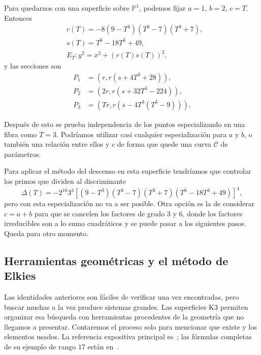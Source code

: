 \documentclass[a4paper]{book}
\theoremstyle{definition}
\theoremstyle{plain}
\newcommand{\PP}{\mathbb{P}}
\newcommand{\cc}{\mathcal{C}}
\newcommand{\lco}{\left\lbrack}
\newcommand{\rco}{\right\rbrack}
\begin{document}
Para quedarnos con una superficie sobre $\PP^1$, podemos fijar $a=1$, $b=2$, $c=T$. Entonces
\[
\begin{aligned}
&r(T) =-8(9-T^3)(T^3-7)(T^3+7),\\
&s(T) =T^6-18T^3+49,\\
&E_T  :y^2=x^3+{(r(T)s(T))}^2,
\end{aligned}
\]
y las secciones son
\[
\begin{aligned}
P_1&=(r,r(s+4T^3+28)),\\
P_2&=(2r,r(s+32T^3-224)),\\
P_3&=(Tr,r(s-4T^3(T^3-9))).
\end{aligned}
\]

Después de esto se prueba independencia de los puntos especializando en una fibra como $T=3$. Podríamos utilizar casi cualquier especialización para $a$ y $b$, o también una relación entre ellos y $c$ de forma que quede una curva $\cc$ de parámetros. 

Para aplicar el método del descenso en esta superficie tendríamos que controlar los primos que dividen al discriminante
\[
\Delta(T)=-2^{16}3^3 \lco(9-T^3)(T^3-7)(T^3+7)(T^6-18T^3+49)\rco ^4,
\]
pero con esta especialización no va a ser posible. Otra opción es la de considerar $c=a+b$ para que se cancelen los factores de grado $3$ y $6$, donde los factores irreducibles son a lo sumo cuadráticos y se puede pasar a los siguientes pasos. Queda para otro momento.

\subsection{Herramientas geométricas y el método de Elkies}

Las identidades anteriores son fáciles de verificar una vez encontradas, pero buscar muchas a la vez produce sistemas grandes. Las superficies K3 permiten organizar esa búsqueda con herramientas procedentes de la geometría que no llegamos a presentar. Contaremos el proceso solo para mencionar que existe y los elementos usados. La referencia expositiva principal es~\cite{Elkies2007HighRank}; las fórmulas completas de su ejemplo de rango $17$ están en~\cite{Elkies2026K3Rank17}.
\end{document}
